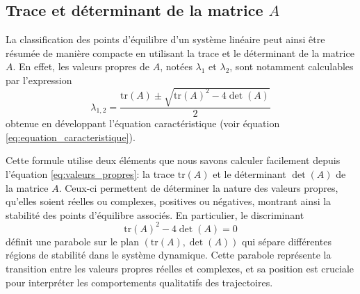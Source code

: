         \subsection{Trace et déterminant de la matrice $A$}
            La classification des points d'équilibre d'un système linéaire peut ainsi être résumée de manière compacte en utilisant la trace et le déterminant de la matrice $A$. En effet, les valeurs propres de $A$, notées $\lambda_1$ et $\lambda_2$, sont notamment calculables par l'expression
            \begin{equation}
                \lambda_{1,2} = \frac{\text{tr}(A) \pm \sqrt{\text{tr}(A)^2 - 4 \det(A)}}{2}
            \end{equation}
            obtenue en développant l'équation caractéristique (voir équation \ref{eq:equation_caracteristique}).
            
            Cette formule utilise deux éléments que nous savons calculer facilement depuis l'équation \ref{eq:valeurs_propres}: la trace $\text{tr}(A)$ et le déterminant $\det(A)$ de la matrice $A$. Ceux-ci permettent de déterminer la nature des valeurs propres, qu'elles soient réelles ou complexes, positives ou négatives, montrant ainsi la stabilité des points d'équilibre associés. En particulier, le discriminant 
            \begin{equation}
                \text{tr}(A)^2 - 4 \det(A) = 0
            \end{equation}
            définit une parabole sur le plan $(\text{tr}(A), \det(A))$ qui sépare différentes régions de stabilité dans le système dynamique. Cette parabole représente la transition entre les valeurs propres réelles et complexes, et sa position est cruciale pour interpréter les comportements qualitatifs des trajectoires. 

